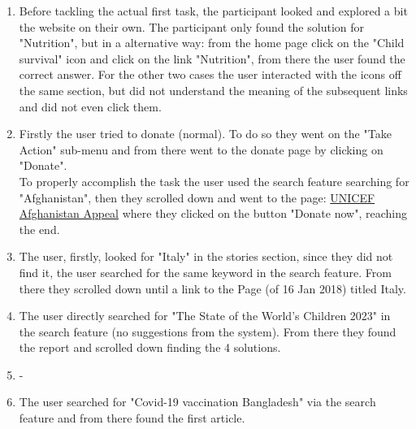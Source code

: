 \begin{enumerate}
	\item Before tackling the actual first task, the participant looked and explored a bit the website on their own. The participant only found the solution for "Nutrition", but in a alternative way: from the home page click on the "Child survival" icon and click on the link "Nutrition", from there the user found the correct answer. For the other two cases the user interacted with the icons off the same section, but did not understand the meaning of the subsequent links and did not even click them.
	\item Firstly the user tried to donate (normal). To do so they went on the "Take Action" sub-menu and from there went to the donate page by clicking on "Donate".\\
	To properly accomplish the task the user used the search feature searching for "Afghanistan", then they scrolled down and went to the page: \href{https://www.unicef.org/appeals/afghanistan}{UNICEF Afghanistan Appeal} where they clicked on the button "Donate now", reaching the end.
	\item The user, firstly, looked for "Italy" in the stories section, since they did not find it, the user searched for the same keyword in the search feature. From there they scrolled down until a link to the Page (of 16 Jan 2018) titled Italy.
	\item The user directly searched for "The State of the World's Children 2023" in the search feature (no suggestions from the system). From there they found the report and scrolled down finding the 4 solutions.
	\item -
	\item The user searched for "Covid-19 vaccination Bangladesh" via the search feature and from there found the first article.
\end{enumerate}

\vspace{1cm}

